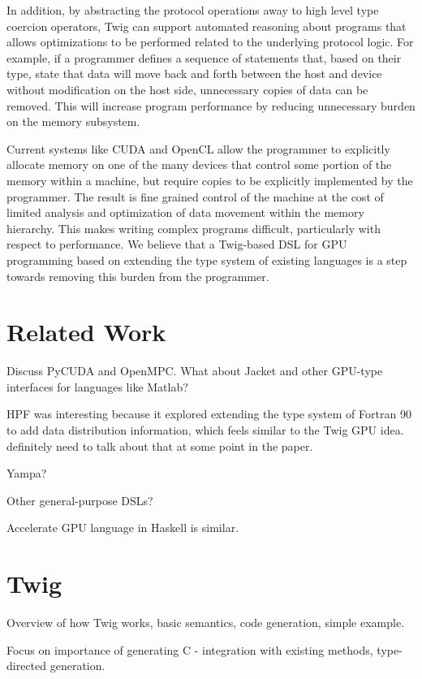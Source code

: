 \documentclass[11pt]{article}
\begin{document}
In addition, by abstracting the protocol operations away to high level type
coercion operators, Twig can support automated reasoning about programs that
allows optimizations to be performed related to the underlying protocol logic.
For example, if a programmer defines a sequence of statements that, based on
their type, state that data will move back and forth between the host and
device without modification on the host side, unnecessary copies of data can
be removed. This will increase program performance by reducing unnecessary
burden on the memory subsystem.

Current systems like CUDA and OpenCL allow the programmer to explicitly
allocate memory on one of the many devices that control some portion of the
memory within a machine, but require copies to be explicitly implemented by
the programmer. The result is fine grained control of the machine at the cost
of limited analysis and optimization of data movement within the memory
hierarchy. This makes writing complex programs difficult, particularly with
respect to performance. We believe that a Twig-based DSL for GPU programming
based on extending the type system of existing languages is a step towards
removing this burden from the programmer.

\section{Related Work}

Discuss PyCUDA and OpenMPC. What about Jacket and other GPU-type interfaces
for languages like Matlab?

HPF was interesting because it explored extending the type system of Fortran
90 to add data distribution information, which feels similar to the Twig GPU
idea. definitely need to talk about that at some point in the paper.

Yampa?

Other general-purpose DSLs?

Accelerate GPU language in Haskell is similar.  

\section{Twig}

Overview of how Twig works, basic semantics, code generation, simple example.

Focus on importance of generating C - integration with existing methods, type-directed generation.
\end{document}
